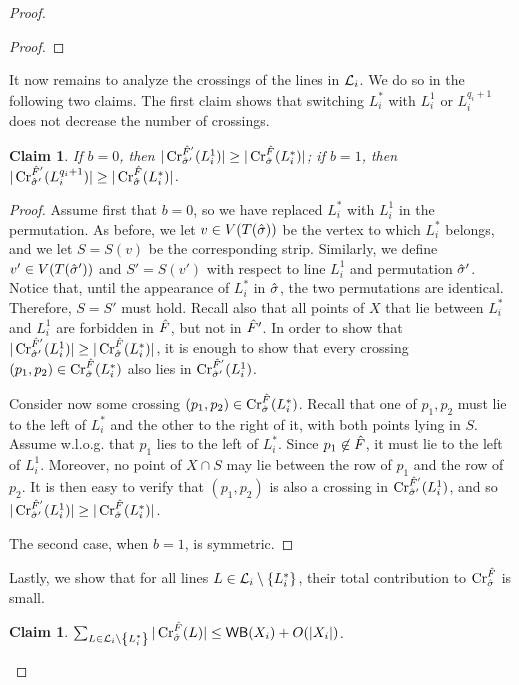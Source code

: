 \documentclass[11pt]{article}
\numberwithin{equation}{section}
\newtheorem{claim}[theorem]{Claim}
\theoremstyle{definition}
\theoremstyle{plain}
\begin{document}
\begin{proof}
\begin{proof}
	\end{proof}
	
	It now remains to analyze the crossings of the lines in ${\mathcal L}_i$. We do so in the following two claims. The first claim shows that switching $L^*_i$ with $L^1_i$ or $L^{q_i+1}_i$ does not decrease the number of crossings.
	
	\begin{claim}
		If $b=0$, then	$|\operatorname{Cr}^{\hat F'}_{\hat{\sigma}'}(L_i^1)|\geq |\operatorname{Cr}^{\hat F}_{\hat{\sigma}}(L^*_i)|$; if $b=1$, then $|\operatorname{Cr}^{\hat F'}_{\hat{\sigma}'}(L_i^{q_i+1})|\geq |\operatorname{Cr}^{\hat F}_{\hat{\sigma}}(L^*_i)|$.
	\end{claim}
	
	\begin{proof}
		Assume first that $b=0$, so we have replaced $L^*_i$ with $L_i^1$ in the permutation. As before, we let $v\in V(T({\hat{\sigma}}))$ be the vertex to which $L^*_i$ belongs, and we let $S=S(v)$ be the corresponding strip. Similarly, we define $v'\in V(T({\hat{\sigma}'}))$ and $S'=S(v')$ with respect to line $L_i^1$ and permutation $\hat{\sigma}'$. Notice that, until the appearance of $L^*_i$ in $\hat{\sigma}$, the two permutations are identical. Therefore, $S=S'$ must hold. Recall also that all points of $X$ that lie between $L^*_i$ and $L_i^1$ are forbidden in $\hat F$, but not in $\hat F'$. In order to show that $|\operatorname{Cr}^{\hat F'}_{\hat{\sigma}'}(L_i^1)|\geq |\operatorname{Cr}^{\hat F}_{\hat{\sigma}}(L^*_i)|$, it is enough to show that every crossing $(p_1,p_2)\in \operatorname{Cr}^{\hat F}_{\hat{\sigma}}(L^*_i)$ also lies in $\operatorname{Cr}^{\hat F'}_{\hat{\sigma}'}(L_i^1)$. 
		
		Consider now some crossing $(p_1,p_2)\in \operatorname{Cr}^{\hat F}_{\hat{\sigma}}(L^*_i)$. Recall that one of $p_1,p_2$ must lie to the left of $L_i^*$ and the other to the right of it, with both points lying in $S$. Assume w.l.o.g. that $p_1$ lies to the left of $L_i^*$. Since $p_1\not\in \hat F$, it must lie to the left of $L^1_i$. Moreover, no point of $X\cap S$ may lie between the row of $p_1$ and the row of $p_2$. It is then easy to verify that $(p_1,p_2)$ is also a crossing in $\operatorname{Cr}^{\hat F'}_{\hat{\sigma}'}(L_i^1)$, and so $|\operatorname{Cr}^{\hat F'}_{\hat{\sigma}'}(L_i^1)|\geq |\operatorname{Cr}^{\hat F}_{\hat{\sigma}}(L^*_i)|$.
		
		The second case, when $b=1$, is symmetric.
	\end{proof}
	
	Lastly, we show that for all lines $L\in {\mathcal L}_i\setminus\left\{ L_i^* \right\}$, their total contribution to $\operatorname{Cr}^{\hat F}_{\hat{\sigma}}$ is small. 
	
	\begin{claim}\label{claim: lines in li contribute little}
		$\sum_{L\in {\mathcal L}_i\setminus\left\{ L_i^* \right\}}|\operatorname{Cr}^{\hat F}_{\hat{\sigma}}(L)|\leq \mathsf{WB}(X_i)+O(|X_i|)$.
	\end{claim}
	

\end{proof}
\end{document}
